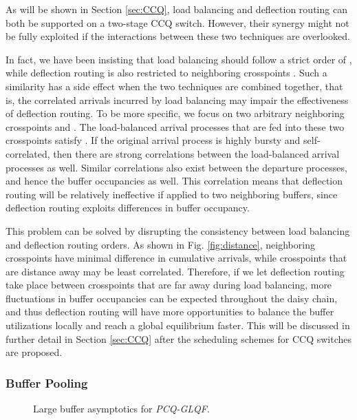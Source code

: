 \documentclass[journal,final,doublecolumn,10pt,twoside]{IEEEtranTCOM} \normalsize
\begin{document}
As will be shown in Section \ref{sec:CCQ}, load balancing and deflection routing can both be supported on a two-stage CCQ switch. However, their synergy might not be fully exploited if the interactions between these two techniques are overlooked.

In fact, we have been insisting that load balancing should follow a strict order of , while deflection routing is also restricted to neighboring crosspoints . Such a similarity has a side effect when the two techniques are combined together, that is, the correlated arrivals incurred by load balancing may impair the effectiveness of deflection routing. To be more specific, we focus on two arbitrary neighboring crosspoints  and . The load-balanced arrival processes that are fed into these two crosspoints satisfy . If the original arrival process is highly bursty and self-correlated, then there are strong correlations between the load-balanced arrival processes as well. Similar correlations also exist between the departure processes, and hence the buffer occupancies as well. This correlation means that deflection routing will be relatively ineffective if applied to two neighboring buffers, since deflection routing exploits differences in buffer occupancy.

This problem can be solved by disrupting the consistency between load balancing and deflection routing orders. As shown in Fig. \ref{fig:distance}, neighboring crosspoints have minimal difference in cumulative arrivals, while crosspoints that are  distance away may be least correlated. Therefore, if we let deflection routing take place between crosspoints that are far away during load balancing, more fluctuations in buffer occupancies can be expected throughout the daisy chain, and thus deflection routing will have more opportunities to balance the buffer utilizations locally and reach a global equilibrium faster. This will be discussed in further detail in Section \ref{sec:CCQ} after the scheduling schemes for CCQ switches are proposed.



\subsubsection{Buffer Pooling}
\label{sec:wxr}

\begin{figure*}[ht]
\centering
\begin{minipage}[t]{2.3 in}
\centering {}
\end{minipage}
\begin{minipage}[t]{2.3 in}
\centering {}
\end{minipage}
\begin{minipage}[t]{2.3 in}
\centering {}
\end{minipage}
\caption{Large buffer asymptotics for \emph{PCQ-GLQF}.}
\label{fig:pooling}
\end{figure*}
\end{document}
